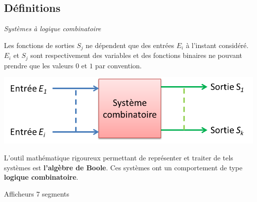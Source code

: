 \documentclass[11pt,oneside]{article}
\begin{document}
\subsection{Définitions}

\begin{minipage}[c]{0.55\linewidth}
\begin{defi}
 \textit{\textsf{Systèmes à logique combinatoire}}

Les fonctions de sorties $S_j$ ne dépendent que des entrées $E_i$ à l'instant
considéré. $E_i$ et $S_j$ sont respectivement des variables et des fonctions
binaires ne pouvant prendre que les valeurs $0$ et $1$ par convention.
\end{defi} 
\end{minipage} \hfill
\begin{minipage}[c]{0.4\linewidth}
 \begin{center}
    \includegraphics[width=\textwidth]{png/comb}
  \end{center}
\end{minipage}




L'outil mathématique rigoureux permettant de représenter et traiter de tels
systèmes est \textbf{l'algèbre de Boole}. Ces systèmes ont un comportement de
type \textbf{logique combinatoire}.


\begin{exemple}
 Afficheurs 7 segments
\end{exemple}
\end{document}
